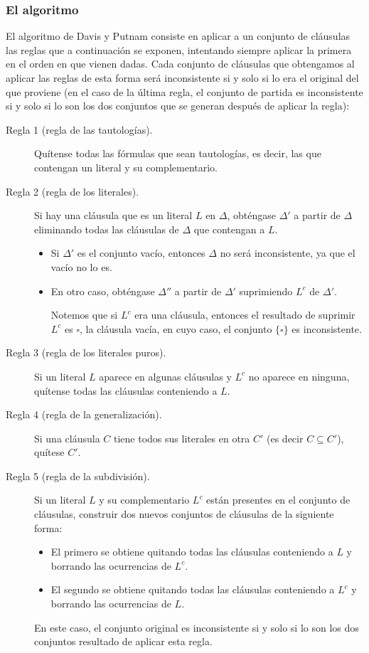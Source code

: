 \subsubsection{El algoritmo}
El algoritmo de Davis y Putnam consiste en aplicar a un conjunto de cláusulas las reglas que a continuación se exponen, intentando siempre aplicar la primera en el orden en que vienen dadas. Cada conjunto de cláusulas que obtengamos al aplicar las reglas de esta forma será inconsistente si y solo si lo era el original del que proviene (en el caso de la última regla, el conjunto de partida es inconsistente si y solo si lo son los dos conjuntos que se generan después de aplicar la regla):
\begin{description}
    \item [Regla 1 (regla de las tautologías).] Quítense todas las fórmulas que sean tautologías, es decir, las que contengan un literal y su complementario.
    \item [Regla 2 (regla de los literales).] Si hay una cláusula que es un literal $L$ en $\Delta$, obténgase $\Delta'$ a partir de $\Delta$ eliminando todas las cláusulas de $\Delta$ que contengan a $L$.
        \begin{itemize}
            \item Si $\Delta'$ es el conjunto vacío, entonces $\Delta$ no será inconsistente, ya que el vacío no lo es.
            \item En otro caso, obténgase $\Delta''$ a partir de $\Delta'$ suprimiendo $L^c$ de $\Delta'$.

                Notemos que si $L^c$ era una cláusula, entonces el resultado de suprimir $L^c$ es $\square$, la cláusula vacía, en cuyo caso, el conjunto $\{\square\}$ es inconsistente.
        \end{itemize}
    \item [Regla 3 (regla de los literales puros).] Si un literal $L$ aparece en algunas cláusulas y $L^c$ no aparece en ninguna, quítense todas las cláusulas conteniendo a $L$.
    \item [Regla 4 (regla de la generalización).] Si una cláusula $C$ tiene todos sus literales en otra $C'$ (es decir $C\subseteq C'$), quítese $C'$.
    \item [Regla 5 (regla de la subdivisión).] Si un literal $L$ y su complementario $L^c$ están presentes en el conjunto de cláusulas, construir dos nuevos conjuntos de cláusulas de la siguiente forma:
        \begin{itemize}
            \item El primero se obtiene quitando todas las cláusulas conteniendo a $L$ y borrando las ocurrencias de $L^c$.
            \item El segundo se obtiene quitando todas las cláusulas conteniendo a $L^c$ y borrando las ocurrencias de $L$.
        \end{itemize}
        En este caso, el conjunto original es inconsistente si y solo si lo son los dos conjuntos resultado de aplicar esta regla.
\end{description}

